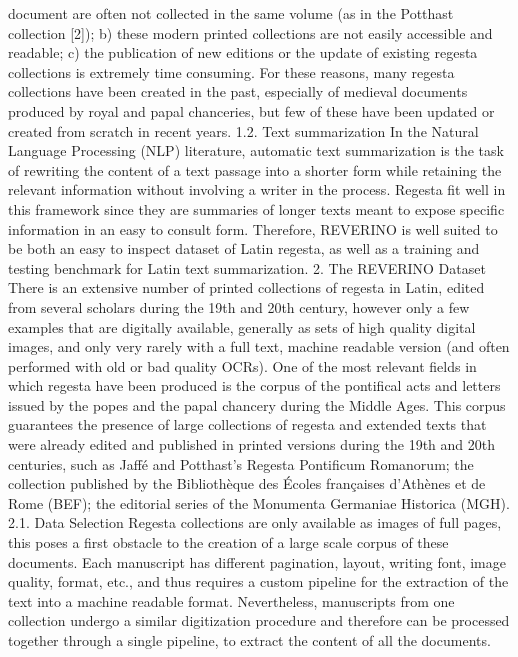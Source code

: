 {document are often not collected in the same volume (as in the Potthast collection [2]); b) these modern
printed collections are not easily accessible and readable; c) the publication of new editions or the
update of existing regesta collections is extremely time consuming. For these reasons, many regesta
collections have been created in the past, especially of medieval documents produced by royal and
papal chanceries, but few of these have been updated or created from scratch in recent years.
1.2. Text summarization
In the Natural Language Processing (NLP) literature, automatic text summarization is the task of
rewriting the content of a text passage into a shorter form while retaining the relevant information
without involving a writer in the process. Regesta fit well in this framework since they are summaries
of longer texts meant to expose specific information in an easy to consult form. Therefore, REVERINO
is well suited to be both an easy to inspect dataset of Latin regesta, as well as a training and testing
benchmark for Latin text summarization.
2. The REVERINO Dataset
There is an extensive number of printed collections of regesta in Latin, edited from several scholars
during the 19th and 20th century, however only a few examples that are digitally available, generally
as sets of high quality digital images, and only very rarely with a full text, machine readable version
(and often performed with old or bad quality OCRs). One of the most relevant fields in which regesta
have been produced is the corpus of the pontifical acts and letters issued by the popes and the papal
chancery during the Middle Ages. This corpus guarantees the presence of large collections of regesta
and extended texts that were already edited and published in printed versions during the 19th and 20th
centuries, such as Jaffé and Potthast’s Regesta Pontificum Romanorum; the collection published by the
Bibliothèque des Écoles françaises d’Athènes et de Rome (BEF); the editorial series of the Monumenta
Germaniae Historica (MGH).
2.1. Data Selection
Regesta collections are only available as images of full pages, this poses a first obstacle to the creation
of a large scale corpus of these documents. Each manuscript has different pagination, layout, writing
font, image quality, format, etc., and thus requires a custom pipeline for the extraction of the text into a
machine readable format. Nevertheless, manuscripts from one collection undergo a similar digitization
procedure and therefore can be processed together through a single pipeline, to extract the content of
all the documents.
}

